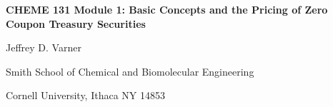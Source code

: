 \documentclass[11pt]{article}
\makeatletter
\theoremstyle{definition}
\renewcommand\subsection{\@startsection
	{subsection}{2}{0mm}
	{-0.05in}
	{0.5\baselineskip}
	{\normalfont\normalsize\bfseries}}
\makeatother
\begin{document}
{\par\centering\textbf{\Large CHEME 131 Module 1: Basic Concepts and the Pricing of Zero Coupon Treasury Securities}}
\vspace{0.2in}
{\par \centering \large{Jeffrey D. Varner}}
\vspace{0.05in}
{\par \centering \large{Smith School of Chemical and Biomolecular Engineering}}
{\par \centering \large{Cornell University, Ithaca NY 14853}}

\date{}
\thispagestyle{empty}

\setcounter{page}{1}



\end{document}
